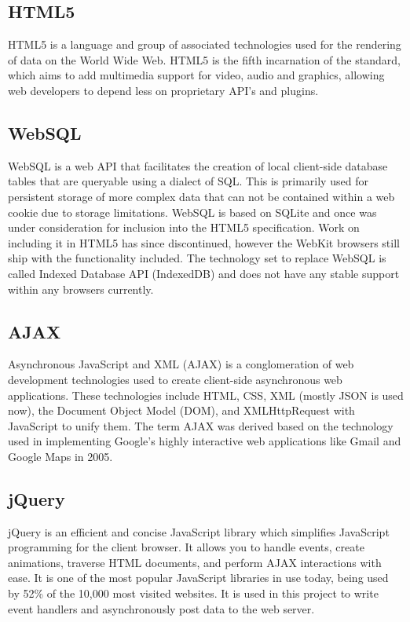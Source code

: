 \documentclass[12pt]{report}	%
\theoremstyle{definition}
\theoremstyle{remark}
\begin{document}
\subsection{HTML5}

HTML5 is a language and group of associated technologies used for the
rendering of data on the World Wide Web. HTML5 is the fifth incarnation
of the standard, which aims to add multimedia support for video, audio
and graphics, allowing web developers to depend less on
proprietary API's and plugins.

\subsection{WebSQL}

WebSQL is a web API that facilitates the creation of local client-side
database tables that are queryable using a dialect of SQL. This is
primarily used for persistent storage of more complex data that can not
be contained within a web cookie due to storage limitations. WebSQL is
based on SQLite and once was under consideration for inclusion into the
HTML5 specification. Work on including it in HTML5 has since
discontinued, however the WebKit browsers still ship with the
functionality included. The technology set to replace WebSQL is called
Indexed Database API (IndexedDB) and does not have any stable support
within any browsers currently.

\subsection{AJAX}

Asynchronous JavaScript and XML (AJAX) is a conglomeration of web
development technologies used to create client-side asynchronous web
applications. These technologies include HTML, CSS, XML (mostly JSON is
used now), the Document Object Model (DOM), and XMLHttpRequest with
JavaScript to unify them. The term AJAX was derived based on the
technology used in implementing Google's highly interactive web
applications like Gmail and Google Maps in 2005.

\subsection{jQuery}

jQuery is an efficient and concise JavaScript library which simplifies
JavaScript programming for the client browser. It allows you to handle
events, create animations, traverse HTML documents, and perform AJAX
interactions with ease. It is one of the most popular JavaScript
libraries in use today, being used by 52\% of the 10,000 most visited
websites. It is used in this project to write event handlers and
asynchronously post data to the web server.
\end{document}
